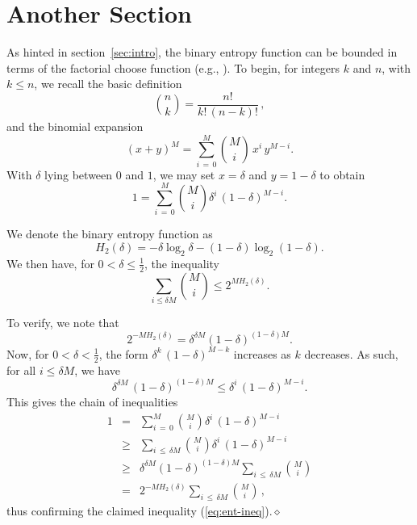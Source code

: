 \documentclass[11pt]{article} %
\begin{document}

\section{Another Section}

As hinted in section~\ref{sec:intro}, the binary entropy function can be bounded in terms of the factorial choose function (e.g., \cite[lemma 2.3.5, p.~33]{gray}). To begin, for integers $k$ and $n$, with $k \le n$, we recall the basic definition
$$
{n \choose k} = \frac{n!}{k! \, (n-k)!}\, ,
$$
and the binomial expansion
$$
(x + y)^M = \sum_{i\,=\,0}^M {M\choose i}\, x^i\, y^{M-i}.
$$
With $\delta$ lying between $0$ and $1$, we may set $x = \delta$ and $y = 1-\delta$
to obtain
$$
1 = \sum_{i\,=\,0}^M {M\choose i} \delta^i\, (1 - \delta)^{M-i}.
$$

We denote the binary entropy function
as
$$
H_2(\delta) = -\delta\log_2\delta - (1 - \delta)\log_2(1 - \delta).
$$
We then have, for $0 < \delta \le \frac{1}{2}$, the inequality
\begin{equation}
 \sum_{i\le \delta M} {M\choose i} \le 2^{M H_2(\delta)}.
 \label{eq:ent-ineq}
\end{equation}


To verify, we note that
$$
2^{-M H_2(\delta)} = \delta^{\delta M} (1 - \delta)^{(1 - \delta)M}.
$$
Now, for $0 < \delta < \frac{1}{2}$, the form
$\delta^k\, (1 - \delta)^{M-k}$ increases as $k$ decreases.
As such, for all $i \le \delta M$, we have
$$
\delta^{\delta M}\,(1 - \delta)^{(1 - \delta)M} \le
 \delta^i\, (1 - \delta)^{M-i} .
$$
This gives the chain of inequalities
\begin{eqnarray*}
 1 &=&
 \sum_{i\,=\,0}^M {M\choose i} \delta^i\, (1 - \delta)^{M-i} 
\\
 &\ge& 
 \sum_{i\,\le\,\delta M} {M\choose i} \delta^i\,(1 - \delta)^{M-i}
\\
 &\ge&
\delta^{\delta M}(1 - \delta)^{(1-\delta)M} \sum_{i\,\le\,\delta M} {M\choose i}
\\
 &=&
 2^{-M H_2(\delta)} \sum_{i\,\le\,\delta M} {M\choose i}\, ,
\end{eqnarray*}
thus confirming the claimed inequality (\ref{eq:ent-ineq}).\hfill$\diamond$
\end{document}
